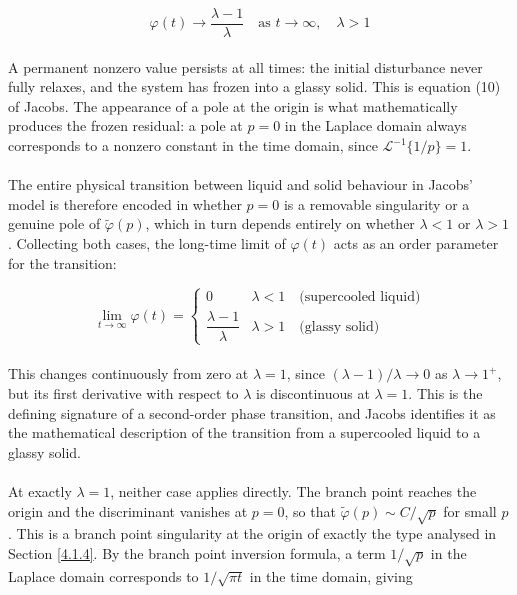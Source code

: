 \begin{equation}
    \boxed{\varphi(t) \to \frac{\lambda-1}{\lambda} \quad 
    \text{as } t \to \infty, \quad \lambda > 1}
    \label{eq:solidphase}
\end{equation}
\\
A permanent nonzero value persists at all times: the initial disturbance never 
fully relaxes, and the system has frozen into a glassy solid. This is 
equation (10) of Jacobs. The appearance of a pole at the origin is what 
mathematically produces the frozen residual: a pole at $p = 0$ in the Laplace 
domain always corresponds to a nonzero constant in the time domain, since 
$\mathcal{L}^{-1}\{1/p\} = 1$.
\\
\\
The entire physical transition between liquid and solid behaviour in Jacobs' 
model is therefore encoded in whether $p = 0$ is a removable singularity or a 
genuine pole of $\tilde{\varphi}(p)$, which in turn depends entirely on whether 
$\lambda < 1$ or $\lambda > 1$. Collecting both cases, the long-time limit of 
$\varphi(t)$ acts as an order parameter for the transition:

\begin{equation}
    \lim_{t \to \infty}\varphi(t) = 
    \begin{cases} 
        0 & \lambda < 1 \quad \text{(supercooled liquid)} \\[6pt] 
        \dfrac{\lambda-1}{\lambda} & \lambda > 1 \quad \text{(glassy solid)} 
    \end{cases}
\end{equation}
\\
This changes continuously from zero at $\lambda = 1$, since 
$(\lambda-1)/\lambda \to 0$ as $\lambda \to 1^+$, but its first derivative with 
respect to $\lambda$ is discontinuous at $\lambda = 1$. This is the defining 
signature of a second-order phase transition, and Jacobs identifies it 
as the mathematical description of the transition from a supercooled liquid to 
a glassy solid.
\\
\\
At exactly $\lambda = 1$, neither case applies directly. The branch point 
reaches the origin and the discriminant vanishes at $p = 0$, so that 
$\tilde{\varphi}(p) \sim C/\sqrt{p}$ for small $p$. This is a branch point 
singularity at the origin of exactly the type analysed in Section \ref{4.1.4}. By 
the branch point inversion formula, a term $1/\sqrt{p}$ in the Laplace domain 
corresponds to $1/\sqrt{\pi t}$ in the time domain, giving

